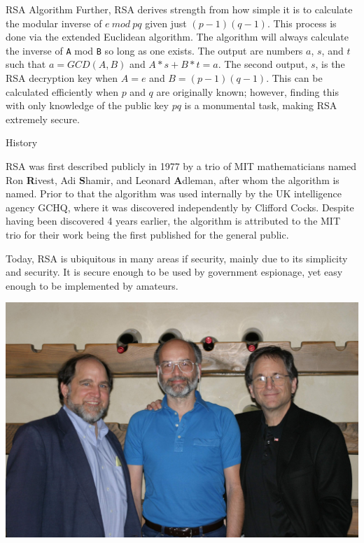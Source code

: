 \documentclass[landscape,fontscale=.4,paperwidth=48in,paperheight=36in]{baposter} %
\begin{document}
\begin{poster}
\begin{posterbox}[name=rsa,column=13,row=0,span=17]{RSA Algorithm}
Further, RSA derives strength from how simple it is to calculate the modular inverse of $e\ mod\ pq$ given just $(p-1)(q-1)$. This process is done via the extended Euclidean algorithm. The algorithm will always calculate the inverse of \verb|A| mod \verb|B| so long as one exists. The output are numbers $a$, $s$, and $t$ such that $a = GCD(A,B)$ and $A*s + B*t = a$. The second output, $s$, is the RSA decryption key when $A=e$ and ${B=(p-1)(q-1)}$. This can be calculated efficiently when $p$ and $q$ are originally known; however, finding this with only knowledge of the public key $pq$ is a monumental task, making RSA extremely secure.  
\end{posterbox}



\begin{posterbox}[name=history, column=13, below=rsa,span=17]{History}
\begin{multicols}{2}
RSA was first described publicly in 1977 by a trio of MIT mathematicians named Ron \textbf{R}ivest, Adi \textbf{S}hamir, and Leonard \textbf{A}dleman, after whom the algorithm is named. Prior to that the algorithm was used internally by the UK intelligence agency GCHQ, where it was discovered independently by Clifford Cocks. Despite having been discovered 4 years earlier, the algorithm is attributed to the MIT trio for their work being the first published for the general public.

Today, RSA is ubiquitous in many areas if security, mainly due to its simplicity and security. It is secure enough to be used by government espionage, yet easy enough to be implemented by amateurs. 

\begin{center}
\includegraphics[width=1\linewidth]{RSA-2003.jpg}
\end{center}





\end{multicols}
\end{posterbox}
\end{poster}
\end{document}
